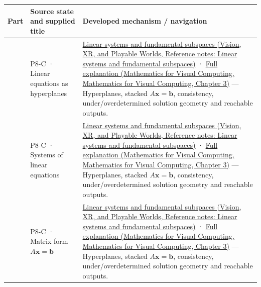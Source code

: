 {\def\LTcaptype{none} %
\begin{longtable}[]{@{}
  >{\raggedright\arraybackslash}p{}
  >{\raggedright\arraybackslash}p{}
  >{\raggedright\arraybackslash}p{}@{}}
\toprule\noalign{}
\begin{minipage}[b]{\linewidth}\raggedright
Part
\end{minipage} & \begin{minipage}[b]{\linewidth}\raggedright
Source state and supplied title
\end{minipage} & \begin{minipage}[b]{\linewidth}\raggedright
Developed mechanism / navigation
\end{minipage} \\
\midrule\noalign{}
\endhead
\bottomrule\noalign{}
\endlastfoot
701 & P8-C · Linear equations as hyperplanes & \href{../07-Vision-XR-and-Playable-Worlds/main.pdf\#nameddest=appendix-8572a4a060c1}{Linear systems and fundamental subspaces (Vision, XR, and Playable Worlds, Reference notes: Linear systems and fundamental subspaces)} · \href{../02-Mathematics-for-Visual-Computing/main.pdf\#nameddest=01-foundations-i-ch019-a-system-is-an-intersection-of-constraints}{Full explanation (Mathematics for Visual Computing, Mathematics for Visual Computing, Chapter 3)} --- Hyperplanes, stacked \(A\mathbf x=\mathbf b\), consistency, under/overdetermined solution geometry and reachable outputs. \\
702 & P8-C · Systems of linear equations & \href{../07-Vision-XR-and-Playable-Worlds/main.pdf\#nameddest=appendix-8572a4a060c1}{Linear systems and fundamental subspaces (Vision, XR, and Playable Worlds, Reference notes: Linear systems and fundamental subspaces)} · \href{../02-Mathematics-for-Visual-Computing/main.pdf\#nameddest=01-foundations-i-ch019-a-system-is-an-intersection-of-constraints}{Full explanation (Mathematics for Visual Computing, Mathematics for Visual Computing, Chapter 3)} --- Hyperplanes, stacked \(A\mathbf x=\mathbf b\), consistency, under/overdetermined solution geometry and reachable outputs. \\
703 & P8-C · Matrix form \(A\mathbf x=\mathbf b\) & \href{../07-Vision-XR-and-Playable-Worlds/main.pdf\#nameddest=appendix-8572a4a060c1}{Linear systems and fundamental subspaces (Vision, XR, and Playable Worlds, Reference notes: Linear systems and fundamental subspaces)} · \href{../02-Mathematics-for-Visual-Computing/main.pdf\#nameddest=01-foundations-i-ch019-a-system-is-an-intersection-of-constraints}{Full explanation (Mathematics for Visual Computing, Mathematics for Visual Computing, Chapter 3)} --- Hyperplanes, stacked \(A\mathbf x=\mathbf b\), consistency, under/overdetermined solution geometry and reachable outputs. \\

\end{longtable}}
